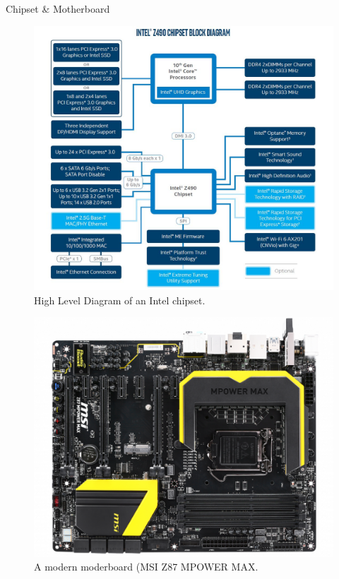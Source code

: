 \documentclass[10pt]{beamer}
\begin{document}
\begin{frame}[allowframebreaks]{Chipset \& Motherboard}
 \begin{figure}
       \begin{center}
       \includegraphics[keepaspectratio, width=\textwidth,height=0.9\textheight-4\baselineskip]{img/202_chipset.jpg}
      \end{center}
      \caption{High Level Diagram of an Intel chipset.~\autocite{intel}}
      \end{figure}
      \framebreak
      \begin{figure}
       \begin{center}
       \includegraphics[keepaspectratio, width=\textwidth,height=0.9\textheight-4\baselineskip]{img/201_mboard.png}
      \end{center}
      \caption{A modern moderboard (MSI Z87 MPOWER MAX.~\autocite{msi}}
      \end{figure}
\end{frame}
\end{document}
